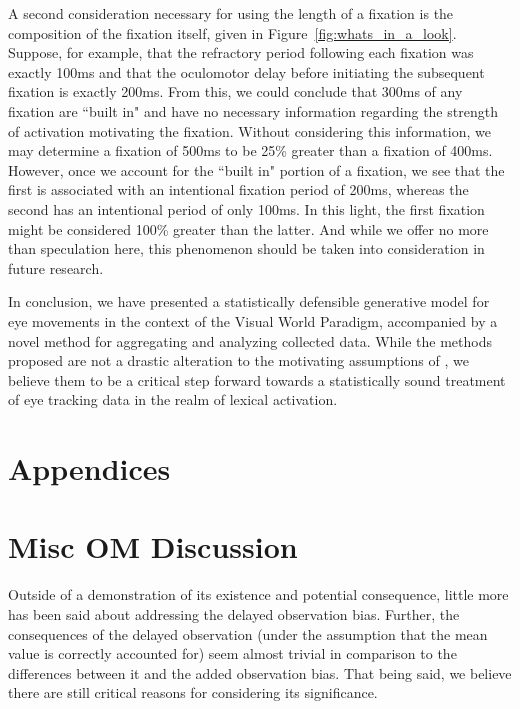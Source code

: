A second consideration necessary for using the length of a fixation is the composition of the fixation itself, given in Figure~\ref{fig:whats_in_a_look}. Suppose, for example, that the refractory period following each fixation was exactly 100ms and that the oculomotor delay before initiating the subsequent fixation is exactly 200ms. From this, we could conclude that 300ms of any fixation are ``built in" and have no necessary information regarding the strength of activation motivating the fixation. Without considering this information, we may determine a fixation of 500ms to be 25\% greater than a fixation of 400ms. However, once we account for the ``built in" portion of a fixation, we see that the first is associated with an intentional fixation period of 200ms, whereas the second has an intentional period of only 100ms. In this light, the first fixation might be considered 100\% greater than the latter. And while we offer no more than speculation here, this phenomenon should be taken into consideration in future research.

In conclusion, we have presented a statistically defensible generative model for eye movements in the context of the Visual World Paradigm, accompanied by a novel method for aggregating and analyzing collected data. While the methods proposed are not a drastic alteration to the motivating assumptions of \citet{allopenna1998tracking}, we believe them to be a critical step forward towards a statistically sound treatment of eye tracking data in the realm of lexical activation.







\section*{Appendices}


\section{Misc OM Discussion}


Outside of a demonstration of its existence and potential consequence, little more has been said about addressing the delayed observation bias. Further, the consequences of the delayed observation (under the assumption that the mean value is correctly accounted for) seem almost trivial in comparison to the differences between it and the added observation bias. That being said, we believe there are still critical reasons for considering its significance.

